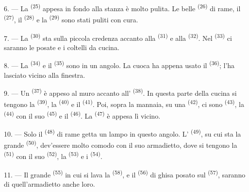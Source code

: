 \VUsaut{4.0mm}
\VUsaut{3.0mm}

6. --- La  \textsuperscript{(25)} appesa in fondo alla
stanza è molto pulita. Le belle  \textsuperscript{(26)} di rame, il
 \textsuperscript{(27)}, il 
\textsuperscript{(28)} e la  \textsuperscript{(29)} sono stati puliti
con cura.

7. --- La  \textsuperscript{(30)} sta sulla piccola credenza accanto
alla  \textsuperscript{(31)} e alla 
\textsuperscript{(32)}. Nel  \textsuperscript{(33)} ci saranno le
posate e i coltelli da cucina.

8. --- La  \textsuperscript{(34)} e il 
\textsuperscript{(35)} sono in un angolo. La cuoca ha appena usato il  \textsuperscript{(36)}; l'ha lasciato vicino alla finestra.

9. --- Un  \textsuperscript{(37)} è appeso al muro accanto
all' \textsuperscript{(38)}. In questa parte della cucina si tengono la
 \textsuperscript{(39)}, la 
\textsuperscript{(40)} e il  \textsuperscript{(41)}. Poi, sopra la
mannaia, su una  \textsuperscript{(42)}, ci sono 
\textsuperscript{(43)}, la  \textsuperscript{(44)} con il
suo  \textsuperscript{(45)} e il 
\textsuperscript{(46)}. La  \textsuperscript{(47)} è appesa lì vicino.

10. --- Solo il  \textsuperscript{(48)} di rame getta un lampo in
questo angolo. L' \textsuperscript{(49)}, su cui sta la grande
 \textsuperscript{(50)}, dev'essere molto comodo con il suo armadietto,
dove si tengono la  \textsuperscript{(51)} con il suo
 \textsuperscript{(52)}, la 
\textsuperscript{(53)} e i  \textsuperscript{(54)}.

\VUsaut{4.0mm}
\VUsaut{3.0mm}

11. --- Il grande  \textsuperscript{(55)} in cui si lava la
 \textsuperscript{(58)}, e il  \textsuperscript{(56)} di
ghisa posato sul  \textsuperscript{(57)}, saranno di
quell'armadietto anche loro.

